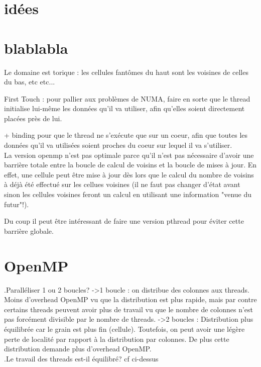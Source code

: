 \section*{idées}



\section*{blablabla}

Le domaine est torique : les cellules fantômes du haut sont les voisines de celles du bas, etc etc...

First Touch : pour pallier aux problèmes de NUMA, faire en sorte que le thread initialise lui-même les données qu'il va utiliser, afin qu'elles soient directement placées près de lui.

+ binding pour que le thread ne s'exécute que sur un coeur, afin que toutes les données qu'il va utilisées soient proches du coeur sur lequel il va s'utiliser.\\

La version openmp n'est pas optimale parce qu'il n'est pas nécessaire d'avoir une barrière totale entre la boucle de calcul de voisins et la boucle de mises à jour. En effet, une cellule peut être mise à jour dès lors que le calcul du nombre de voisins à déjà été effectué sur les cellues voisines (il ne faut pas changer d'état avant sinon les cellules voisines feront un calcul en utilisant une information "venue du futur"!).

Du coup il peut être intéressant de faire une version pthread pour éviter cette barrière globale.

\section*{OpenMP}

.Paralléliser 1 ou 2 boucles?
->1 boucle : on distribue des colonnes aux threads. Moins d'overhead OpenMP vu que la distribution est plus rapide, mais par contre certains threads peuvent avoir plus de travail vu que le nombre de colonnes n'est pas forcément divisible par le nombre de threads.
->2 boucles : Distribution plus équilibrée car le grain est plus fin (cellule). Toutefois, on peut avoir une légère perte de localité par rapport à la distribution par colonnes. De plus cette distribution demande plus d'overhead OpenMP.\\

.Le travail des threads est-il équilibré?
cf ci-dessus\\

